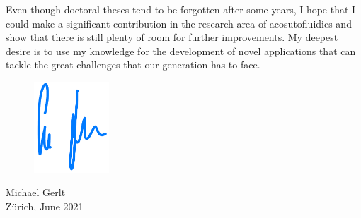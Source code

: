 Even though doctoral theses tend to be forgotten after some years, I hope that 
I could make a significant contribution in the research area of acosutofluidics 
and show that there is still plenty of room for further improvements. My 
deepest desire is to use my knowledge for the development of novel applications 
that can tackle the great challenges that our generation has to face.

\begin{flushleft}
\begin{figure}[h]
\begin{flushleft}
 \hspace{1 cm} \includegraphics[width=0.25\textwidth]{Unterschrift.png}
\end{flushleft}
\end{figure}
\vspace{-0.1 cm}
\hspace{1 cm} Michael Gerlt\\
\hspace{1 cm} Zürich, June 2021
\end{flushleft}
